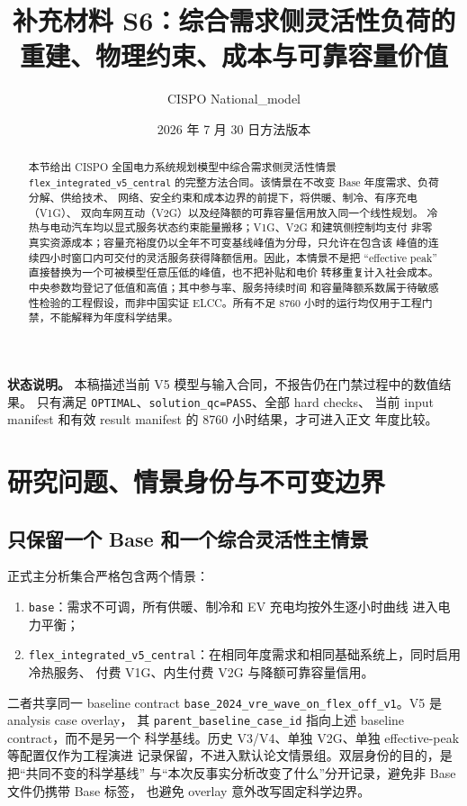 \documentclass[UTF8,fontset=fandol,12pt]{ctexart}
\title{\textbf{补充材料 S6：综合需求侧灵活性负荷的重建、物理约束、成本与可靠容量价值}}
\author{CISPO National\_model}
\date{2026 年 7 月 30 日方法版本}
\newcommand{\code}[1]{\nolinkurl{#1}}
\newcommand{\casebase}{\code{base}}
\newcommand{\casev}{\code{flex_integrated_v5_central}}
\newcommand{\status}[1]{\nolinkurl{#1}}
\begin{document}
\maketitle

\begin{abstract}
本节给出 CISPO 全国电力系统规划模型中综合需求侧灵活性情景
\casev{} 的完整方法合同。该情景在不改变 Base 年度需求、负荷分解、供给技术、
网络、安全约束和成本边界的前提下，将供暖、制冷、有序充电（V1G）、
双向车网互动（V2G）以及经降额的可靠容量信用放入同一个线性规划。
冷热与电动汽车均以显式服务状态约束能量搬移；V1G、V2G 和建筑侧控制均支付
非零真实资源成本；容量充裕度仍以全年不可变基线峰值为分母，只允许在包含该
峰值的连续四小时窗口内可交付的灵活服务获得降额信用。因此，本情景不是把
``effective peak'' 直接替换为一个可被模型任意压低的峰值，也不把补贴和电价
转移重复计入社会成本。中央参数均登记了低值和高值；其中参与率、服务持续时间
和容量降额系数属于待敏感性检验的工程假设，而非中国实证 ELCC。所有不足
8760 小时的运行均仅用于工程门禁，不能解释为年度科学结果。
\end{abstract}

\noindent\textbf{状态说明。}
本稿描述当前 V5 模型与输入合同，不报告仍在门禁过程中的数值结果。
只有满足 \status{OPTIMAL}、\status{solution_qc=PASS}、全部 hard checks、
当前 input manifest 和有效 result manifest 的 8760 小时结果，才可进入正文
年度比较。

\section{研究问题、情景身份与不可变边界}

\subsection{只保留一个 Base 和一个综合灵活性主情景}

正式主分析集合严格包含两个情景：
\begin{enumerate}
  \item \casebase：需求不可调，所有供暖、制冷和 EV 充电均按外生逐小时曲线
  进入电力平衡；
  \item \casev：在相同年度需求和相同基础系统上，同时启用冷热服务、
  付费 V1G、内生付费 V2G 与降额可靠容量信用。
\end{enumerate}

二者共享同一 baseline contract
\code{base_2024_vre_wave_on_flex_off_v1}。V5 是 analysis case overlay，
其 \code{parent_baseline_case_id} 指向上述 baseline contract，而不是另一个
科学基线。历史 V3/V4、单独 V2G、单独 effective-peak 等配置仅作为工程演进
记录保留，不进入默认论文情景组。双层身份的目的，是把``共同不变的科学基线''
与``本次反事实分析改变了什么''分开记录，避免非 Base 文件仍携带 Base 标签，
也避免 overlay 意外改写固定科学边界。
\end{document}
